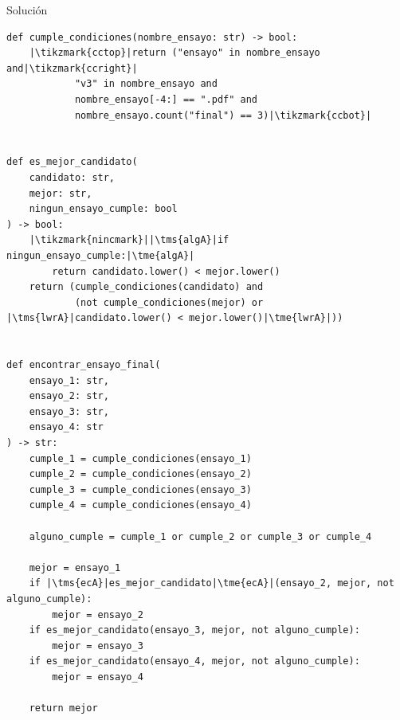 \documentclass{ip-quiz}
\begin{document}
\begin{sectionbox}{Solución}
\begin{verbatim}
def cumple_condiciones(nombre_ensayo: str) -> bool:
    |\tikzmark{cctop}|return ("ensayo" in nombre_ensayo and|\tikzmark{ccright}|
            "v3" in nombre_ensayo and
            nombre_ensayo[-4:] == ".pdf" and
            nombre_ensayo.count("final") == 3)|\tikzmark{ccbot}|


def es_mejor_candidato(
    candidato: str,
    mejor: str,
    ningun_ensayo_cumple: bool
) -> bool:
    |\tikzmark{nincmark}||\tms{algA}|if ningun_ensayo_cumple:|\tme{algA}|
        return candidato.lower() < mejor.lower()
    return (cumple_condiciones(candidato) and
            (not cumple_condiciones(mejor) or |\tms{lwrA}|candidato.lower() < mejor.lower()|\tme{lwrA}|))


def encontrar_ensayo_final(
    ensayo_1: str, 
    ensayo_2: str, 
    ensayo_3: str, 
    ensayo_4: str
) -> str:
    cumple_1 = cumple_condiciones(ensayo_1)
    cumple_2 = cumple_condiciones(ensayo_2)
    cumple_3 = cumple_condiciones(ensayo_3)
    cumple_4 = cumple_condiciones(ensayo_4)

    alguno_cumple = cumple_1 or cumple_2 or cumple_3 or cumple_4

    mejor = ensayo_1
    if |\tms{ecA}|es_mejor_candidato|\tme{ecA}|(ensayo_2, mejor, not alguno_cumple):
        mejor = ensayo_2
    if es_mejor_candidato(ensayo_3, mejor, not alguno_cumple):
        mejor = ensayo_3
    if es_mejor_candidato(ensayo_4, mejor, not alguno_cumple):
        mejor = ensayo_4

    return mejor
\end{verbatim}

\end{sectionbox}
\end{document}
